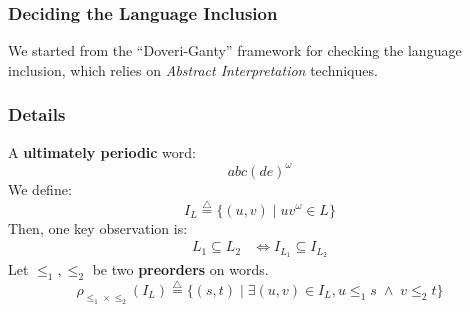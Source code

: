 \documentclass{beamer}
\begin{document}
\begin{frame}
\frametitle{Deciding the Language Inclusion}
We started from the ``Doveri-Ganty'' framework for checking the language inclusion,
which relies on \emph{Abstract Interpretation} techniques.

\begin{figure}[h]
	\centering
\end{figure}
\end{frame}



\begin{frame}
\frametitle{Details}
A \textbf{ultimately periodic} word:
\[ abc(de)^{\omega} \]
\pause
We define:
\[ I_{L} \overset{\triangle}{=} \{ (u,v) \;|\; uv ^{\omega} \in L\} \]
\pause
Then, one key observation is:
\begin{equation*}
\begin{split}
L_1 \subseteq L_2 & \Longleftrightarrow I_{L_1} \subseteq I_{L_2}
\end{split}
\end{equation*}
\pause
Let $\leq_1, \leq_2$ be two \textbf{preorders} on words.
\[ \rho_{\leq_1 \times \leq_2}(I_L) \overset{\triangle}{=} \{(s,t) \;|\; \exists (u,v) \in I_L, u \leq_1 s \; \wedge \; v \leq_2 t\} \]
\end{frame}
\end{document}

